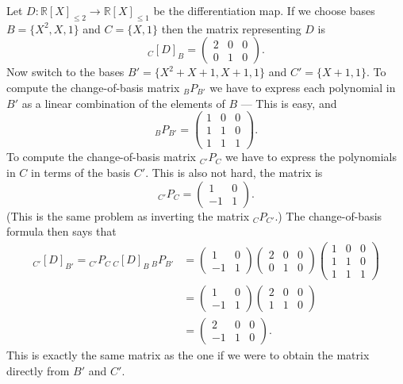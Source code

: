 \documentclass[12pt]{report}
\theoremstyle{definition}
\begin{document}
\begin{ex}
    Let $D:\mathbb{R}{[X]}_{\le 2}\rightarrow\mathbb{R}{[X]}_{\le 1}$
    be the differentiation map.
    If we choose bases $B=\{X^{2}, X, 1\}$ and $C=\{X, 1\}$
    then the matrix representing $D$ is\[
        {}_C{[D]}_{B} = \begin{pmatrix}
            2 & 0 & 0 \\
            0 & 1 & 0
        \end{pmatrix}.
    \]Now switch to the bases $B'=\{X^{2} + X + 1, X + 1, 1\}$
    and $C'=\{X + 1, 1\}$. To compute the change-of-basis matrix
    ${}_B{P}_{B'}$ we have to express each polynomial in $B'$ as
    a linear combination of the elements of $B$ --- This is easy, and\[
        {}_B{P}_{B'} = \begin{pmatrix}
           1 & 0 & 0 \\
           1 & 1 & 0 \\
           1 & 1 & 1
       \end{pmatrix}.
    \]
    To compute the change-of-basis matrix ${}_{C'}P_C$ we have to 
    express the polynomials in $C$ in terms of the basis $C'$.
    This is also not hard, the matrix is\[
       {}_{C'}P_C = \begin{pmatrix}
           1 & 0 \\
           -1 & 1
       \end{pmatrix}.
   \](This is the same problem as inverting the matrix ${}_C{P}_{C'}$.)
   The change-of-basis formula then says that
   \begin{align*}
        {}_{C'}{[D]}_{B'} = {}_{C'}P_{C}\,{}_{C}{[D]}_{B}\,{}_{B}P_{B'}
        & = \begin{pmatrix}
            1 & 0 \\
            -1 & 1
        \end{pmatrix} \begin{pmatrix}
            2 & 0 & 0 \\
            0 & 1 & 0
        \end{pmatrix} \begin{pmatrix}
            1 & 0 & 0 \\
            1 & 1 & 0 \\
            1 & 1 & 1
        \end{pmatrix} \\
        & = \begin{pmatrix}
            1 & 0 \\
            -1 & 1
        \end{pmatrix} \begin{pmatrix}
            2 & 0 & 0 \\
            1 & 1 & 0
        \end{pmatrix} \\
        & = \begin{pmatrix}
            2 & 0 & 0 \\
            -1 & 1 & 0
        \end{pmatrix}.
   \end{align*} 
   This is exactly the same matrix as the one if we were to obtain the matrix
   directly from $B'$ and $C'$.
\end{ex} 
\end{document}
